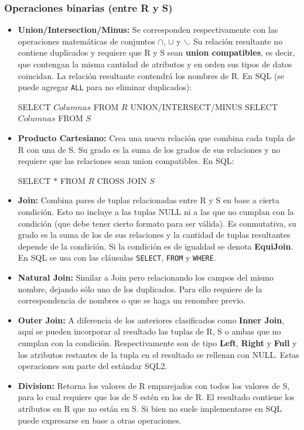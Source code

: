 \subsubsection*{Operaciones binarias (entre R y S)}
\begin{itemize}
    \item \textbf{Union/Intersection/Minus:} Se corresponden respectivamente con las operaciones matemáticas de conjuntos $\cap$, $\cup$ y $\backslash$. Su relación resultante no contiene duplicados y requiere que R y S sean \textbf{union compatibles}, es decir, que contengan la misma cantidad de atributos y en orden sus tipos de datos coincidan. La relación resultante contendrá los nombres de R. En SQL (se puede agregar \texttt{ALL} para no eliminar duplicados):
    \begin{SQL}
        SELECT $Columnas$ FROM $R$ UNION/INTERSECT/MINUS SELECT $Columnas$ FROM $S$
    \end{SQL}
    \item \textbf{Producto Cartesiano:} Crea una nueva relación que combina cada tupla de R con una de S. Su grado es la suma de los grados de sus relaciones y no requiere que las relaciones sean union compatibles. En SQL:
    \begin{SQL}
        SELECT $*$ FROM $R$ CROSS JOIN $S$
    \end{SQL}
    \item \textbf{Join:} Combina pares de tuplas relacionadas entre R y S en base a cierta condición. Esto no incluye a las tuplas NULL ni a las que no cumplan con la condición (que debe tener cierto formato para ser válida). Es conmutativa, su grado es la suma de los de sus relaciones y la cantidad de tuplas resultantes depende de la condición. Si la condición es de igualdad se denota \textbf{EquiJoin}. En SQL se usa con las cláusulas \texttt{SELECT}, \texttt{FROM} y \texttt{WHERE}.
    \item \textbf{Natural Join:} Similar a Join pero relacionando los campos del mismo nombre, dejando sólo uno de los duplicados. Para ello requiere de la correspondencia de nombres o que se haga un renombre previo.
    \item \textbf{Outer Join:} A diferencia de los anteriores clasificados como \textbf{Inner Join}, aquí se pueden incorporar al resultado las tuplas de R, S o ambas que no cumplan con la condición. Respectivamente son de tipo \textbf{Left}, \textbf{Right} y \textbf{Full} y los atributos restantes de la tupla en el resultado se rellenan con NULL. Estas operaciones son parte del estándar SQL2.
    \item \textbf{Division:} Retorna los valores de R emparejados con todos los valores de S, para lo cual requiere que los de S estén en los de R. El resultado contiene los atributos en R que no están en S. Si bien no suele implementarse en SQL puede expresarse en base a otras operaciones.
\end{itemize}

